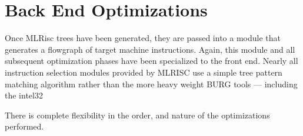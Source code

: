 \section{Back End Optimizations}

  Once MLRisc trees have been generated, they are passed into a module
  that generates a flowgraph of target machine instructions. Again,
  this module and all subsequent optimization phases have been
  specialized to the front end.  
   Nearly all
  instruction selection modules provided by MLRISC use a simple tree
  pattern matching algorithm rather than the more heavy weight BURG
  tools --- including the intel32  There is complete flexibility in the order,
  and nature of the optimizations performed. 
